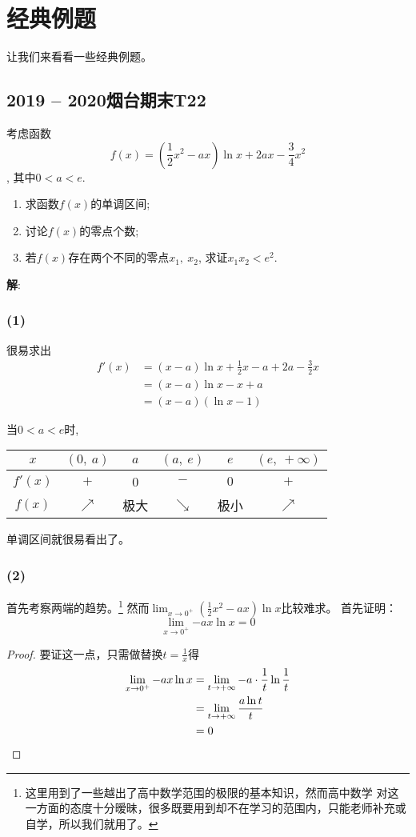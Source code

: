 \section{经典例题}
让我们来看看一些经典例题。

\subsection{2019 -- 2020烟台期末T22}
考虑函数
\[f(x) = (\frac{1}{2}x^2 - ax)\ln{x} + 2ax - \frac{3}{4}x^2\], 
其中\(0 < a < e\).

\begin{enumerate}
\item 求函数\(f(x)\)的单调区间;
\item 讨论\(f(x)\)的零点个数;
\item 若\(f(x)\)存在两个不同的零点\(x_1,\ x_2\),  求证\(x_1x_2 < e^2\).
\end{enumerate}
\textbf{解}:

\subsubsection{(1)}
很易求出
\begin{align}
f'(x) 
&= (x - a)\ln{x} + \frac{1}{2}x - a + 2a - \frac{3}{2}x \nonumber \\
&= (x - a)\ln{x} - x + a \nonumber \\
&= (x - a)(\ln{x} -1)
\end{align}

当\(0 < a < e\)时, 
\begin{center}
\begin{tabular}{|c|c|c|c|c|c|}
\hline
\(x\) & \((0,\ a)\) & \(a\) & \((a,\ e)\) & \(e\) 
& \((e,\ +\infty)\) \\
\hline
\(f'(x)\) & \(+\) & 0 & \(-\) & \(0\) & \(+\) \\
\hline
\(f(x)\) & \(\nearrow\) & 极大 & \(\searrow\) & 极小 & \(\nearrow\) \\
\hline
\end{tabular}
\end{center}

单调区间就很易看出了。

\subsubsection{(2)}
首先考察两端的趋势。\footnote{这里用到了一些越出了高中数学范围的极限的基本知识，然而高中数学
对这一方面的态度十分暧昧，很多既要用到却不在学习的范围内，只能老师补充或自学，所以我们就用了。}
然而\(\lim_{x \rightarrow 0^{+}}{(\frac{1}{2}x^2 - ax)\ln{x}}\)比较难求。
首先证明：
\[
\lim_{x \rightarrow 0^{+}}{-ax\ln{x}} = 0
\]
\begin{proof}
要证这一点，只需做替换\(t=\frac{1}{x}\)得
\begin{align}
\lim_{x \rightarrow 0^{+}}{-ax\ln{x}} 
&= \lim_{t \rightarrow +\infty}{-a \cdot \frac{1}{t}\ln{\frac{1}{t}}} 
\nonumber \\
&= \lim_{t \rightarrow +\infty}{\frac{a\ln{t}}{t}} \nonumber \\
&= 0 \qedhere
\end{align}
\end{proof}

